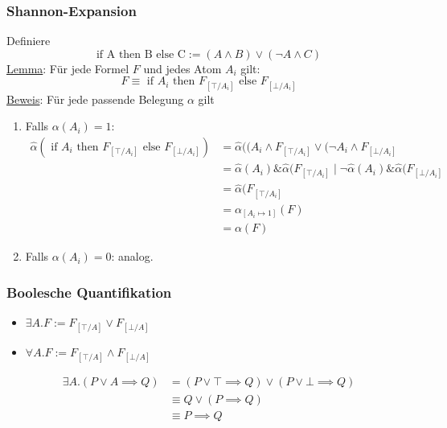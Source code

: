 \documentclass{scrartcl}
\begin{document}
\subsubsection{Shannon-Expansion}

Definiere
\begin{equation}
	\text{if A then B else C} := (A \wedge B) \vee (\neg A \wedge C)
\end{equation}
\underline{Lemma}: Für jede Formel $F$ und jedes Atom $A_i$ gilt:
\begin{equation}
	F \equiv \text{ if } A_i \text{ then } F_{[\top / A_i]} \text{ else } F_{[\bot / A_i]}
\end{equation}
\underline{Beweis}: Für jede passende Belegung $\alpha$ gilt
\begin{enumerate}
	\item Falls $\alpha(A_i) = 1$:
	\begin{equation}
		\begin{split}
			\widehat{\alpha}(\text{ if } A_i \text{ then } F_{[\top / A_i]} \text{ else } F_{[\bot / A_i]}) &= \widehat{\alpha}((A_i \wedge F_{[\top / A_i]} \vee (\neg A_i \wedge F_{[\bot / A_i]} \\
			&= \widehat{\alpha}(A_i) \& \widehat{\alpha}(F_{[\top / A_i]} \mid \neg \widehat{\alpha}(A_i) \& \widehat{\alpha}(F_{[\bot / A_i]} \\
			&= \widehat{\alpha}(F_{[\top / A_i]} \\
			&= \alpha_{[A_i \mapsto 1]}(F) \\
			&= \alpha(F)
		\end{split}
	\end{equation}
	\item Falls $\alpha(A_i) = 0$: analog.
\end{enumerate}

\subsubsection{Boolesche Quantifikation}

\begin{itemize}
	\item $\exists A.F := F_{[\top / A]} \vee F_{[\bot / A]}$
	\item $\forall A.F := F_{[\top / A]} \wedge F_{[\bot / A]}$
\end{itemize}

\begin{equation}
	\begin{split}
		\exists A.(P \vee A \implies Q) &= (P \vee \top \implies Q) \vee (P \vee \bot \implies Q) \\
		&\equiv Q \vee (P \implies Q) \\
		&\equiv P \implies Q
	\end{split}
\end{equation}
\end{document}
